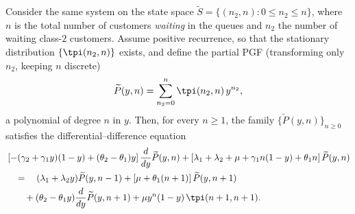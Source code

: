 \begin{lemma}\label{lem:gen:PPGF_dynamics}
    Consider the same system on the state space
    $\widetilde{S}=\{(n_2,n):0\le n_2\le n\}$, where $n$ is the total number of customers
    \emph{waiting} in the queues and $n_2$ the number of waiting class-$2$ customers.
    Assume positive recurrence, so that the stationary distribution
    $\{\tpi(n_2,n)\}$ exists, and define the partial PGF (transforming only $n_2$,
    keeping $n$ discrete)
    \[
        \widetilde{P}(y,n)=\sum_{n_2=0}^{n}\tpi(n_2,n)\,y^{n_2},
    \]
    a polynomial of degree $n$ in $y$. Then, for every $n\ge 1$, the family
    $\{\widetilde{P}(y,n)\}_{n\ge 0}$ satisfies the differential--difference equation
    \begin{equation}
    \begin{split}
        & \left[ -(\gamma_2 + \gamma_1 y)(1-y) + (\theta_2 - \theta_1) y \right] \frac{d}{dy} \widetilde{P}(y,n)
          + \left[ \lambda_1 + \lambda_2 + \mu + \gamma_1 n(1-y) + \theta_1 n \right] \widetilde{P}(y,n) \\
        & \quad = \quad (\lambda_1 + \lambda_2 y) \widetilde{P}(y,n-1)
          + \left[ \mu + \theta_1 (n+1) \right] \widetilde{P}(y,n+1) \\
        & \quad \quad + (\theta_2 - \theta_1 y) \frac{d}{dy} \widetilde{P}(y,n+1)
          + \mu y^{n} (1-y)\, \tpi(n+1,n+1).
    \end{split}
    \label{eq:gen:PPGF_dynamics}
    \end{equation}
\end{lemma}

